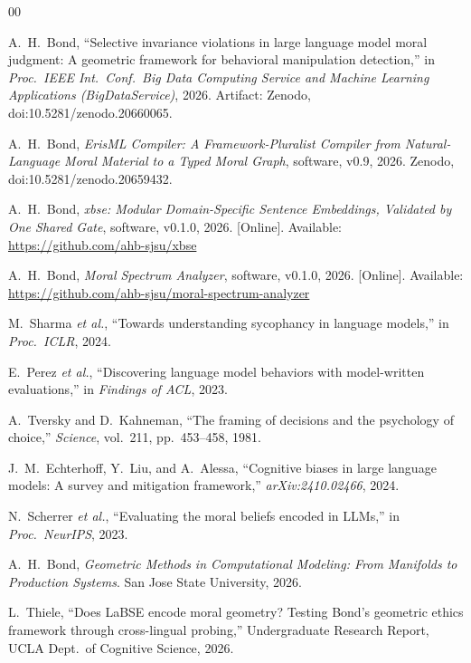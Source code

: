 \documentclass[journal]{IEEEtran}
\begin{document}
\begin{thebibliography}{00}

A.~H.~Bond, ``Selective invariance violations in large language model moral
judgment: A geometric framework for behavioral manipulation detection,'' in
\emph{Proc.\ IEEE Int.\ Conf.\ Big Data Computing Service and Machine
Learning Applications (BigDataService)}, 2026. Artifact: Zenodo,
doi:10.5281/zenodo.20660065.

A.~H.~Bond, \emph{ErisML Compiler: A Framework-Pluralist Compiler from
Natural-Language Moral Material to a Typed Moral Graph}, software, v0.9,
2026. Zenodo, doi:10.5281/zenodo.20659432.

A.~H.~Bond, \emph{xbse: Modular Domain-Specific Sentence Embeddings,
Validated by One Shared Gate}, software, v0.1.0, 2026. [Online]. Available:
\url{https://github.com/ahb-sjsu/xbse}

A.~H.~Bond, \emph{Moral Spectrum Analyzer}, software, v0.1.0, 2026.
[Online]. Available: \url{https://github.com/ahb-sjsu/moral-spectrum-analyzer}

M.~Sharma \emph{et al.}, ``Towards understanding sycophancy in language
models,'' in \emph{Proc.\ ICLR}, 2024.

E.~Perez \emph{et al.}, ``Discovering language model behaviors with
model-written evaluations,'' in \emph{Findings of ACL}, 2023.

A.~Tversky and D.~Kahneman, ``The framing of decisions and the psychology of
choice,'' \emph{Science}, vol.~211, pp.~453--458, 1981.

J.~M.~Echterhoff, Y.~Liu, and A.~Alessa, ``Cognitive biases in large
language models: A survey and mitigation framework,'' \emph{arXiv:2410.02466},
2024.

N.~Scherrer \emph{et al.}, ``Evaluating the moral beliefs encoded in LLMs,''
in \emph{Proc.\ NeurIPS}, 2023.

A.~H.~Bond, \emph{Geometric Methods in Computational Modeling: From Manifolds
to Production Systems}. San Jose State University, 2026.

L.~Thiele, ``Does LaBSE encode moral geometry? Testing Bond's geometric
ethics framework through cross-lingual probing,'' Undergraduate Research
Report, UCLA Dept.\ of Cognitive Science, 2026.


\end{thebibliography}
\end{document}
